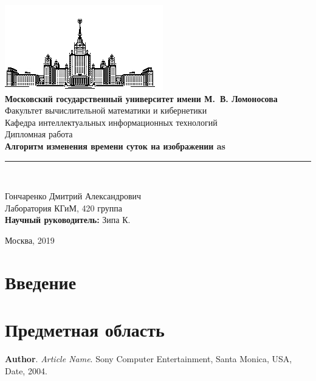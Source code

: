 \documentclass[11pt,a4paper]{extarticle}
\begin{document}
\begin{titlepage}
	\begin{centering}
		\includegraphics{img/msu}\\
		\large{
			\textbf{Московский государственный университет имени М.\ В. Ломоносова}\\
			Факультет вычислительной математики и кибернетики\\
			Кафедра интеллектуальных информационных технологий\\[4cm]
		}
		\Large{
			Дипломная работа\\[0.5cm]
		}
		\Large{
			\textbf{Алгоритм изменения времени суток на изображении
				as
			}\\
		}
		\rule[0.3cm]{14cm}{0.02cm}\\[3cm]
	\end{centering}
	\begin{flushright}
		\large{
			Гончаренко Дмитрий Александрович\\
			Лаборатория КГиМ, 420 группа \\
			
			\textbf{Научный руководитель:} Зипа К.\\
		}
	\end{flushright}
	\begin{center}
		\vfill
		\large{
			Москва, 2019
		}
	\end{center}
\end{titlepage}

\begin{abstract}
	
\end{abstract}

\newpage
\tableofcontents
\newpage

\section{Введение}

\section{Предметная область}

\begin{thebibliography}{00}

	\textbf{Author}.
	\emph{Article Name}.
	Sony Computer Entertainment, Santa Monica, USA,
	Date, 2004.


\end{thebibliography}
\end{document}
